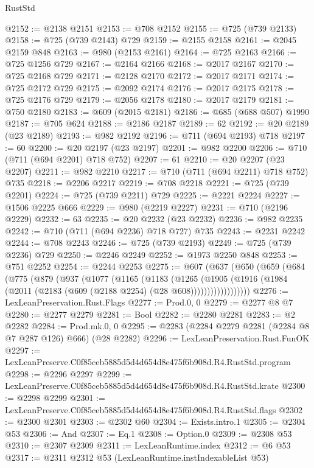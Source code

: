 \begin{lexlean}{RustStd}
\begin{coremodule}
@2152 := @2138 @2151
@2153 := @708 @2152
@2155 := @725 (@739 @2133)
@2158 := @725 (@739 @2143) @729
@2159 := @2155 @2158
@2161 := @2045 @2159 @848
@2163 := @980 (@2153 @2161)
@2164 := @725 @2163
@2166 := @725 @1256 @729
@2167 := @2164 @2166
@2168 := @2017 @2167
@2170 := @725 @2168 @729
@2171 := @2128 @2170
@2172 := @2017 @2171
@2174 := @725 @2172 @729
@2175 := @2092 @2174
@2176 := @2017 @2175
@2178 := @725 @2176 @729
@2179 := @2056 @2178
@2180 := @2017 @2179
@2181 := @750 @2180
@2183 := @609 (@2015 @2181)
@2186 := @685 (@688 @507) @1990
@2187 := @705 @624
@2188 := @2186 @2187
@2189 := 62
@2192 := @20 @2189 (@23 @2189)
@2193 := @982 @2192
@2196 := @711 (@694 @2193) @718
@2197 := 60
@2200 := @20 @2197 (@23 @2197)
@2201 := @982 @2200
@2206 := @710 (@711 (@694 @2201) @718 @752)
@2207 := 61
@2210 := @20 @2207 (@23 @2207)
@2211 := @982 @2210
@2217 := @710 (@711 (@694 @2211) @718 @752) @735
@2218 := @2206 @2217
@2219 := @708 @2218
@2221 := @725 (@739 @2201)
@2224 := @725 (@739 @2211) @729
@2225 := @2221 @2224
@2227 := @1506 @2225 @666
@2229 := @980 (@2219 @2227)
@2231 := @710 (@2196 @2229)
@2232 := 63
@2235 := @20 @2232 (@23 @2232)
@2236 := @982 @2235
@2242 := @710 (@711 (@694 @2236) @718 @727) @735
@2243 := @2231 @2242
@2244 := @708 @2243
@2246 := @725 (@739 @2193)
@2249 := @725 (@739 @2236) @729
@2250 := @2246 @2249
@2252 := @1973 @2250 @848
@2253 := @751 @2252
@2254 := @2244 @2253
@2275 := @607
    (@637
      (@650
        (@659
          (@684
            (@775
              (@879
                (@937
                  (@1077
                    (@1165
                      (@1183
                        (@1265
                          (@1905
                            (@1916
                              (@1984 (@2011 (@2183 (@609 (@2188 @2254) (@28 @608))))))))))))))))))
@2276 := LexLeanPreservation.Rust.Flags
@2277 := Prod.{0, 0}
@2279 := @2277 @8 @7
@2280 := @2277 @2279
@2281 := Bool
@2282 := @2280 @2281
@2283 := @2 @2282
@2284 := Prod.mk.{0, 0}
@2295 := @2283 (@2284 @2279 @2281 (@2284 @8 @7 @287 @126) @666) (@28 @2282)
@2296 := LexLeanPreservation.Rust.FunOK
@2297 := LexLeanPreserve.C0f85ceb5885d5d4d654d8e475f6b908d.R4.RustStd.program
@2298 := @2296 @2297
@2299 := LexLeanPreserve.C0f85ceb5885d5d4d654d8e475f6b908d.R4.RustStd.krate
@2300 := @2298 @2299
@2301 := LexLeanPreserve.C0f85ceb5885d5d4d654d8e475f6b908d.R4.RustStd.flags
@2302 := @2300 @2301
@2303 := @2302 @60
@2304 := Exists.intro.{1}
@2305 := @2304 @53
@2306 := And
@2307 := Eq.{1}
@2308 := Option.{0}
@2309 := @2308 @53
@2310 := @2307 @2309
@2311 := LexLeanRuntime.index
@2312 := @6 @53
@2317 := @2311 @2312 @53 (LexLeanRuntime.instIndexableList @53)

\end{coremodule}
\end{lexlean}
